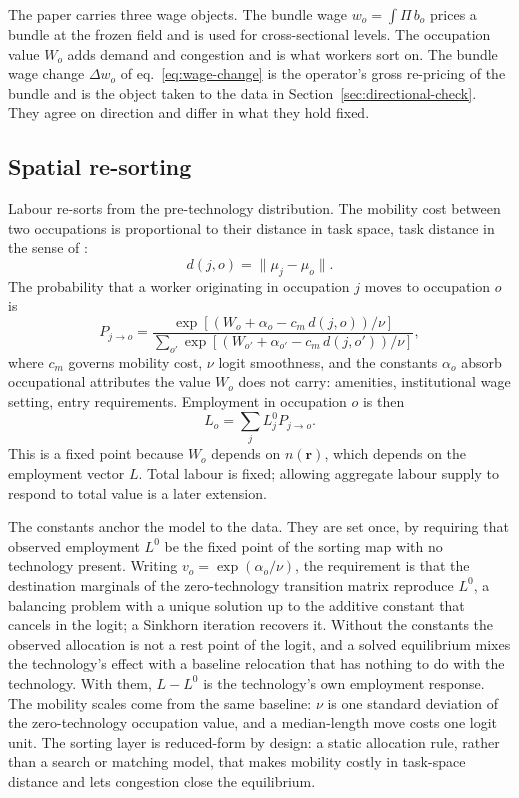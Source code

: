 \documentclass[12pt, a4paper]{article}
\begin{document}
The paper carries three wage objects. The bundle wage
$w_o=\int\Pi\,b_o$ prices a bundle at the frozen field and is used for
cross-sectional levels. The occupation value $W_o$ adds demand and
congestion and is what workers sort on. The bundle wage change
$\Delta w_o$ of eq.~\eqref{eq:wage-change} is the operator's gross
re-pricing of the bundle and is the object taken to the data in
Section~\ref{sec:directional-check}. They agree on direction and differ
in what they hold fixed.

\subsection{Spatial re-sorting}
\label{sec:sorting}

Labour re-sorts from the pre-technology distribution. The mobility cost
between two occupations is proportional to their distance in task space,
task distance in the sense of \textcite{gathmann2010}:
\[
  d(j,o)=\|\mu_j-\mu_o\|.
\]
The probability that a worker originating in occupation $j$ moves to
occupation $o$ is
\begin{equation}
  P_{j\to o}
  =
  \frac{
    \exp[(W_o+\alpha_o-c_m\,d(j,o))/\nu]
  }{
    \sum_{o'}
    \exp[(W_{o'}+\alpha_{o'}-c_m\,d(j,o'))/\nu]
  },
  \label{eq:transition-probability}
\end{equation}
where $c_m$ governs mobility cost, $\nu$ logit smoothness, and the
constants $\alpha_o$ absorb occupational attributes the value $W_o$
does not carry: amenities, institutional wage setting, entry
requirements. Employment
in occupation $o$ is then
\begin{equation}
  L_o
  =
  \sum_j L_j^0 P_{j\to o}.
  \label{eq:equilibrium}
\end{equation}
This is a fixed point because $W_o$ depends on $n(\mathbf{r})$, which
depends on the employment vector $L$. Total labour is fixed; allowing
aggregate labour supply to respond to total value is a later extension.

The constants anchor the model to the data. They are set once, by
requiring that observed employment $L^0$ be the fixed point of the
sorting map with no technology present. Writing
$v_o=\exp(\alpha_o/\nu)$, the requirement is that the destination
marginals of the zero-technology transition matrix reproduce $L^0$, a
balancing problem with a unique solution up to the additive constant
that cancels in the logit; a Sinkhorn iteration recovers it. Without
the constants the observed allocation is not a rest point of the
logit, and a solved equilibrium mixes the technology's effect with a
baseline relocation that has nothing to do with the technology. With
them, $L-L^0$ is the technology's own employment response. The
mobility scales come from the same baseline: $\nu$ is one standard
deviation of the zero-technology occupation value, and a median-length
move costs one logit unit.
The sorting layer is reduced-form by design: a static allocation rule,
rather than a search or matching model, that makes mobility costly in
task-space distance and lets congestion close the equilibrium.
\end{document}
